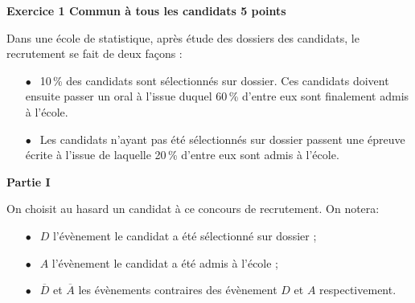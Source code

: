\textbf{\large Exercice 1 \hfill Commun à tous les candidats \hfill 5 points}

\medskip

Dans une école de statistique, après étude des dossiers des candidats, le recrutement se fait de deux façons :

\setlength\parindent{1cm}
\begin{itemize}
\item[$\bullet~~$] 10\,\% des candidats sont sélectionnés sur dossier. Ces candidats doivent ensuite passer un oral à l'issue duquel 60\,\% d'entre eux sont finalement admis à l'école.
\item[$\bullet~~$] Les candidats n'ayant pas été sélectionnés sur dossier passent une épreuve écrite à l'issue de laquelle 20\,\% d'entre eux sont admis à l'école.
\end{itemize}
\setlength\parindent{0cm}


\begin{center}
\textbf{Partie I}
\end{center}

On choisit au hasard un candidat à ce concours de recrutement. On notera:

\setlength\parindent{1cm}
\begin{itemize}
\item[$\bullet~~$] $D$ l'évènement \og le candidat a été sélectionné sur dossier \fg{} ;
\item[$\bullet~~$] $A$ l'évènement \og le candidat a été admis à l'école \fg{} ;
\item[$\bullet~~$] $\overline{D}$ et $\overline{A}$ les évènements contraires des évènement $D$ et $A$ respectivement.
\end{itemize}
\setlength\parindent{0cm}

\medskip

